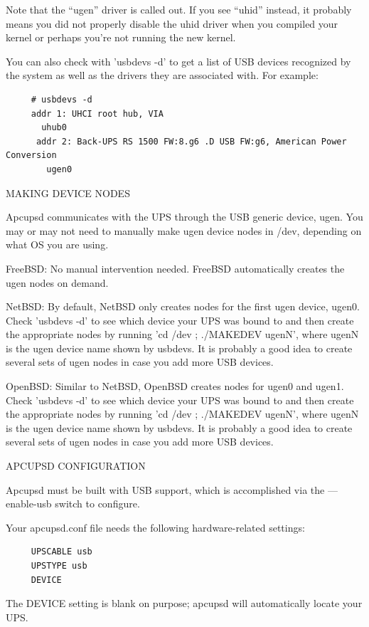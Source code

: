 Note that the ``ugen'' driver is called out. If you see ``uhid'' instead, it
probably means you did not properly disable the uhid driver when you compiled
your kernel or perhaps you're not running the new kernel.  

You can also check with 'usbdevs -d' to get a list of USB devices recognized
by the system as well as the drivers they are associated with. For example: 

\footnotesize
\begin{verbatim}
     # usbdevs -d
     addr 1: UHCI root hub, VIA
       uhub0
      addr 2: Back-UPS RS 1500 FW:8.g6 .D USB FW:g6, American Power Conversion
        ugen0
\end{verbatim}
\normalsize

MAKING DEVICE NODES  

Apcupsd communicates with the UPS through the USB generic device, ugen. You
may or may not need to manually make ugen device nodes in /dev, depending on
what OS you are using.  

FreeBSD: No manual intervention needed. FreeBSD automatically creates the ugen
nodes on demand.  

NetBSD: By default, NetBSD only creates nodes for the first ugen device,
ugen0. Check 'usbdevs -d' to see which device your UPS was bound to and then
create the appropriate nodes by running 'cd /dev ; ./MAKEDEV ugenN', where
ugenN is the ugen device name shown by usbdevs. It is probably a good idea to
create several sets of ugen nodes in case you add more USB devices.  

OpenBSD: Similar to NetBSD, OpenBSD creates nodes for ugen0 and ugen1. Check
'usbdevs -d' to see which device your UPS was bound to and then create the
appropriate nodes by running 'cd /dev ; ./MAKEDEV ugenN', where ugenN is the
ugen device name shown by usbdevs. It is probably a good idea to create
several sets of ugen nodes in case you add more USB devices.  

APCUPSD CONFIGURATION  

Apcupsd must be built with USB support, which is accomplished via the
{---}enable-usb switch to configure.  

Your apcupsd.conf file needs the following hardware-related settings: 

\footnotesize
\begin{verbatim}
     UPSCABLE usb
     UPSTYPE usb
     DEVICE
\end{verbatim}
\normalsize

The DEVICE setting is blank on purpose; apcupsd will automatically locate your
UPS.  


